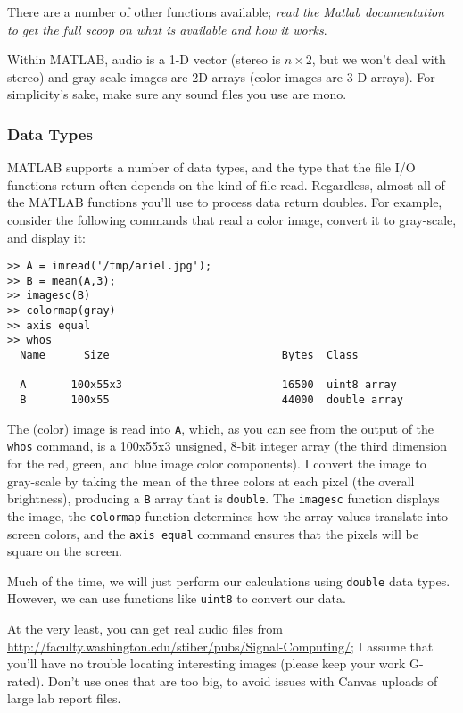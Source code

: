 There are a number of other functions available; \emph{read the Matlab
  documentation to get the full scoop on what is available and how it
  works}.

Within MATLAB, audio is a 1-D vector (stereo is $n \times 2$, but we
won't deal with stereo) and gray-scale images are 2D arrays (color
images are 3-D arrays). For simplicity's sake, make sure any sound
files you use are mono.

\subsubsection{Data Types}

MATLAB supports a number of data types, and the type that the file I/O
functions return often depends on the kind of file read. Regardless,
almost all of the MATLAB functions you'll use to process data return
doubles. For example, consider the following commands that read a
color image, convert it to gray-scale, and display it:
\begin{lstlisting}[style=Matlab-editor,basicstyle=\mlttfamily\small]
>> A = imread('/tmp/ariel.jpg');
>> B = mean(A,3);
>> imagesc(B)
>> colormap(gray)
>> axis equal
>> whos
  Name      Size                           Bytes  Class

  A       100x55x3                         16500  uint8 array
  B       100x55                           44000  double array
\end{lstlisting}
The (color) image is read into \verb|A|, which, as you can see from
the output of the \verb|whos| command, is a 100x55x3 unsigned, 8-bit
integer array (the third dimension for the red, green, and blue image
color components). I convert the image to gray-scale by taking the
mean of the three colors at each pixel (the overall brightness),
producing a \verb|B| array that is \verb|double|. The
\verb|imagesc| function displays the image, the \verb|colormap|
function determines how the array values translate into screen colors,
and the \verb|axis equal| command ensures that the pixels will be
square on the screen.

Much of the time, we will just perform our calculations using
\verb|double| data types. However, we can use functions like
\verb|uint8| to convert our data.

At the very least, you can get real audio files from
\url{http://faculty.washington.edu/stiber/pubs/Signal-Computing/}; I assume that
you'll have no trouble locating interesting images (please keep your
work G-rated). Don't use ones that are too big, to avoid issues with
Canvas uploads of large lab report files.

